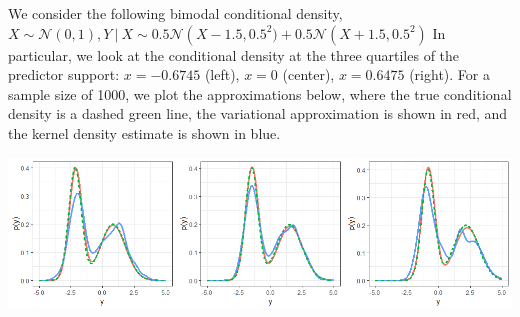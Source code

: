 \documentclass[a0paper,portrait]{baposter}
\newcommand\given[1][]{\:#1\vert\:}
\newcommand{\compresslist}{%
\setlength{\itemsep}{0pt}%
\setlength{\parskip}{1pt}%
\setlength{\parsep}{0pt}%
}
\newenvironment{boenumerate}
  {\begin{enumerate}\renewcommand\labelenumi{\textbf\theenumi.}}
  {\end{enumerate}}
\begin{document}
\begin{poster}
{We consider the following bimodal conditional density, $X \sim \mathcal{N}(0,1), Y \given X \sim 0.5 \mathcal{N}\left( X - 1.5, 0.5^2) + 0.5 \mathcal{N} \left( X + 1.5, 0.5^2 \right)$ In particular, we look at the conditional density at the three quartiles of the predictor support: $x = -0.6745$ (left), $x = 0$ (center), $x = 0.6475$ (right). For a sample size of 1000, we plot the approximations below, where the true conditional density is a dashed green line, the variational approximation is shown in red, and the kernel density estimate is shown in blue. 
\begin{center}
\hspace{0pt}\includegraphics[width=0.75\linewidth]{unimodal_N1000}
\end{center}

}





\end{poster}
\end{document}
